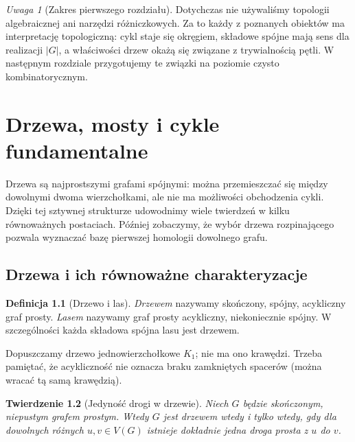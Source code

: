 \documentclass[11pt,a4paper]{report}
\numberwithin{equation}{section}
\theoremstyle{plain}
\newtheorem{twierdzenie}{Twierdzenie}[section]
\theoremstyle{definition}
\newtheorem{definicja}[twierdzenie]{Definicja}
\theoremstyle{remark}
\newtheorem{uwaga}[twierdzenie]{Uwaga}
\begin{document}
\begin{uwaga}[Zakres pierwszego rozdziału]
Dotychczas nie używaliśmy topologii algebraicznej ani
narzędzi różniczkowych. Za to każdy z poznanych obiektów
ma interpretację topologiczną: cykl staje się okręgiem,
składowe spójne mają sens dla realizacji $|G|$, a
właściwości drzew okażą się związane z trywialnością
pętli. W następnym rozdziale przygotujemy te związki
na poziomie czysto kombinatorycznym.
\end{uwaga}

\chapter{Drzewa, mosty i cykle fundamentalne}
\label{ch:tg-drzewa}

Drzewa są najprostszymi grafami spójnymi: można przemieszczać się
między dowolnymi dwoma wierzchołkami, ale nie ma możliwości
obchodzenia cykli. Dzięki tej sztywnej strukturze udowodnimy
wiele twierdzeń w kilku równoważnych postaciach. Później
zobaczymy, że wybór drzewa rozpinającego pozwala wyznaczać
bazę pierwszej homologii dowolnego grafu.

\section{Drzewa i ich równoważne charakteryzacje}
\label{sec:tg-def-drzewo}

\begin{definicja}[Drzewo i las]
\emph{Drzewem} nazywamy skończony, spójny, acykliczny
graf prosty. \emph{Lasem} nazywamy graf prosty
acykliczny, niekoniecznie spójny. W szczególności
każda składowa spójna lasu jest drzewem.
\end{definicja}

Dopuszczamy drzewo jednowierzchołkowe $K_1$; nie ma
ono krawędzi. Trzeba pamiętać, że acykliczność
nie oznacza braku zamkniętych spacerów (można
wracać tą samą krawędzią).

\begin{twierdzenie}[Jedyność drogi w drzewie]
Niech $G$ będzie skończonym, niepustym grafem prostym.
Wtedy $G$ jest drzewem wtedy i tylko wtedy, gdy
dla dowolnych różnych $u,v\in V(G)$ istnieje
dokładnie jedna droga prosta z $u$ do $v$.
\end{twierdzenie}
\end{document}
